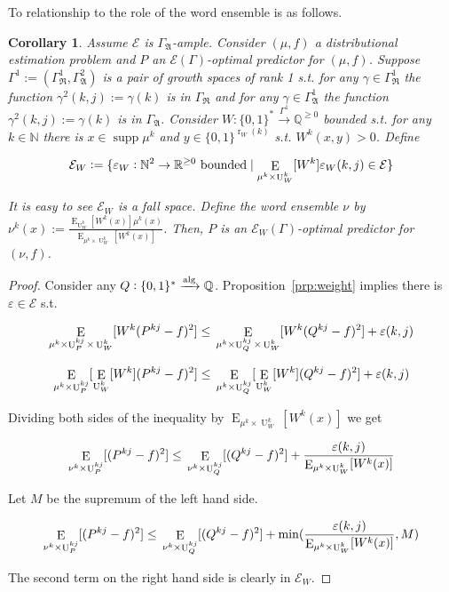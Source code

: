 \documentclass{article}
\numberwithin{equation}{section}
\theoremstyle{definition}
\theoremstyle{plain}
\newtheorem{corollary}{Corollary}[section]
\newcommand{\Bool}{\{0,1\}}
\newcommand{\Words}{{\Bool^*}}
\newcommand{\WordsLen}[1]{{\Bool^{#1}}}
\DeclareMathOperator{\Supp}{supp}
\DeclareMathOperator{\E}{E}
\DeclareMathOperator{\R}{r}
\DeclareMathOperator{\U}{U}
\newcommand{\Nats}{\mathbb{N}}
\newcommand{\Rats}{\mathbb{Q}}
\newcommand{\Reals}{\mathbb{R}}
\newcommand{\GrowR}{\Gamma_{\mathfrak{R}}}
\newcommand{\GrowA}{\Gamma_{\mathfrak{A}}}
\newcommand{\Fall}{\mathcal{E}}
\newcommand{\Alg}{\xrightarrow{\textnormal{alg}}}
\begin{document}
To relationship to the role of the word ensemble is as follows.

\begin{samepage}
\begin{corollary}

Assume $\Fall$ is $\GrowA$-ample. Consider $(\mu,f)$ a distributional estimation problem and $P$ an $\Fall(\Gamma)$-optimal predictor for $(\mu,f)$. Suppose $\Gamma^1:=(\GrowR^1,\GrowA^2)$ is a pair of growth spaces of rank 1 s.t. for any $\gamma \in \GrowR^1$ the function ${\gamma^2(k,j):=\gamma(k)}$ is in $\GrowR$ and for any $\gamma \in \GrowA^1$ the function $\gamma^2(k,j):=\gamma(k)$ is in $\GrowA$. Consider ${W: \Words \xrightarrow{\Gamma^1} \Rats^{\geq 0}}$ bounded s.t. for any $k \in \Nats$ there is $x \in \Supp \mu^k$ and $y \in \WordsLen{\R_W(k)}$ s.t. $W^k(x,y) > 0$. Define 

$${\Fall_W:=\{\varepsilon_W: \Nats^2 \rightarrow \Reals^{\geq 0} \textnormal{ bounded} \mid  \E_{\mu^k \times \U_W^k}[W^k]\varepsilon_W(k,j) \in \Fall\}}$$

It is easy to see $\Fall_W$ is a fall space. Define the word ensemble $\nu$ by ${\nu^k(x):=\frac{\E_{\U_W^k}[W^k(x)] \mu^k(x)}{\E_{\mu^k \times \U_W^k}[W^k(x)]}}$. Then, $P$ is an $\Fall_W(\Gamma)$-optimal predictor for $(\nu,f)$.

\end{corollary}
\end{samepage}

\begin{proof}

Consider any $Q: \Words \Alg \Rats$. Proposition~\ref{prp:weight} implies there is $\varepsilon \in \Fall$ s.t.

$$\E_{\mu^k \times \U_P^{kj} \times \U_W^k}[W^k(P^{kj} - f)^2] \leq \\ \E_{\mu^k \times \U_Q^{kj} \times \U_W^k}[W^k(Q^{kj} - f)^2] + \varepsilon(k,j)$$

$$\E_{\mu^k \times \U_P^{kj}}[\E_{\U_W^k}[W^k](P^{kj} - f)^2] \leq \\ \E_{\mu^k \times \U_Q^{kj}}[\E_{\U_W^k}[W^k](Q^{kj} - f)^2] + \varepsilon(k,j)$$

Dividing both sides of the inequality by $\E_{\mu^k \times \U_W^k}[W^k(x)]$ we get

$$\E_{\nu^k \times \U_P^{kj}}[(P^{kj} - f)^2] \leq \\ \E_{\nu^k \times \U_Q^{kj}}[(Q^{kj} - f)^2] + \frac{\varepsilon(k,j)}{\E_{\mu^k \times \U_W^k}[W^k(x)]}$$

Let $M$ be the supremum of the left hand side.

$$\E_{\nu^k \times \U_P^{kj}}[(P^{kj} - f)^2] \leq \\ \E_{\nu^k \times \U_Q^{kj}}[(Q^{kj} - f)^2] + \min(\frac{\varepsilon(k,j)}{\E_{\mu^k \times \U_W^k}[W^k(x)]},M)$$

The second term on the right hand side is clearly in $\Fall_W$.

\end{proof}
\end{document}
